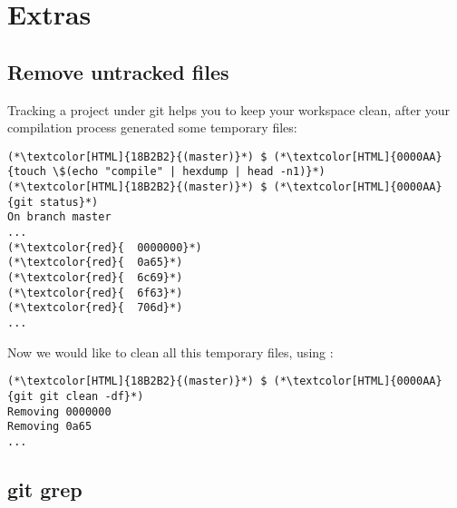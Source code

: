 \section{Extras}
\begin{frame}[fragile]
  \slidetitle
\end{frame}

\subsection{Remove untracked files}
\begin{frame}[fragile]
    \subslidetitle
  Tracking a project under git helps you to keep your workspace clean, after your compilation process generated some temporary files:

  \begin{lstlisting}
(*\textcolor[HTML]{18B2B2}{(master)}*) $ (*\textcolor[HTML]{0000AA}{touch \$(echo "compile" | hexdump | head -n1)}*)
(*\textcolor[HTML]{18B2B2}{(master)}*) $ (*\textcolor[HTML]{0000AA}{git status}*)
On branch master
...
(*\textcolor{red}{	0000000}*)
(*\textcolor{red}{	0a65}*)
(*\textcolor{red}{	6c69}*)
(*\textcolor{red}{	6f63}*)
(*\textcolor{red}{	706d}*)
...
\end{lstlisting}
  Now we would like to clean all this temporary files, using :
  \begin{lstlisting}
(*\textcolor[HTML]{18B2B2}{(master)}*) $ (*\textcolor[HTML]{0000AA}{git git clean -df}*)
Removing 0000000
Removing 0a65
...
\end{lstlisting}

\end{frame}
\subsection{git grep}
\begin{frame}[fragile]
  \subslidetitle
\end{frame}

